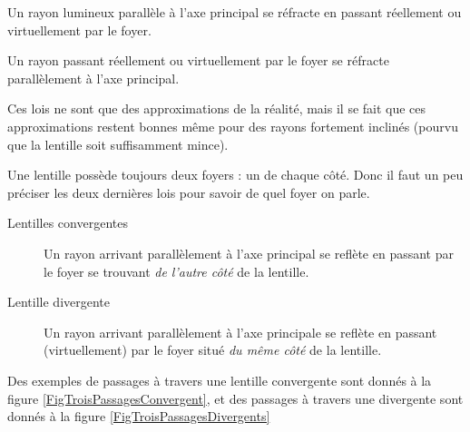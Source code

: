 \begin{loiphyz}
Un rayon lumineux parallèle à l'axe principal se réfracte en passant réellement ou virtuellement par le foyer.
\end{loiphyz}

\begin{loiphyz}
Un rayon passant réellement ou virtuellement par le foyer se réfracte parallèlement à l'axe principal.
\end{loiphyz}

Ces lois ne sont que des approximations de la réalité, mais il se fait que ces approximations restent bonnes même pour des rayons fortement inclinés (pourvu que la lentille soit suffisamment mince).

\label{PgRemarqueFoyer}Une lentille possède toujours deux foyers : un de chaque côté. Donc il faut un peu préciser les deux dernières lois pour savoir de quel foyer on parle.
\begin{description}
\item[Lentilles convergentes] Un rayon arrivant parallèlement à l'axe principal se reflète en passant par le foyer se trouvant \emph{de l'autre côté} de la lentille.
\item[Lentille divergente] Un rayon arrivant parallèlement à l'axe principale se reflète en passant (virtuellement) par le foyer situé \emph{du même côté} de la lentille.
\end{description}
Des exemples de passages à travers une lentille convergente sont donnés à la figure \ref{FigTroisPassagesConvergent}, et des passages à travers une divergente sont donnés à la figure \ref{FigTroisPassagesDivergents}

